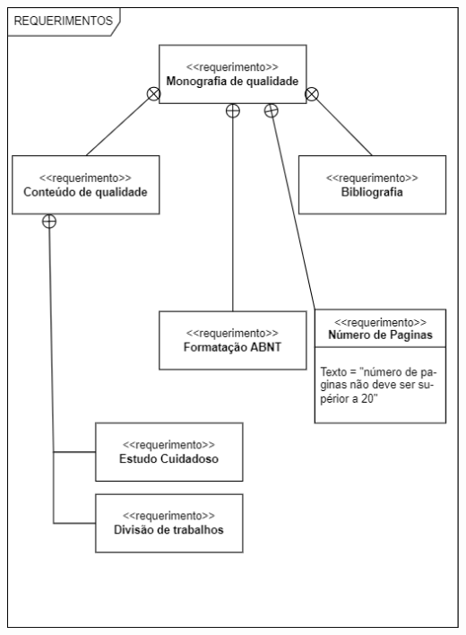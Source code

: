 \includegraphics[width=\textwidth/2,height=\textheight,keepaspectratio]{figures/diagrama de requistos exemplo 1.png}

